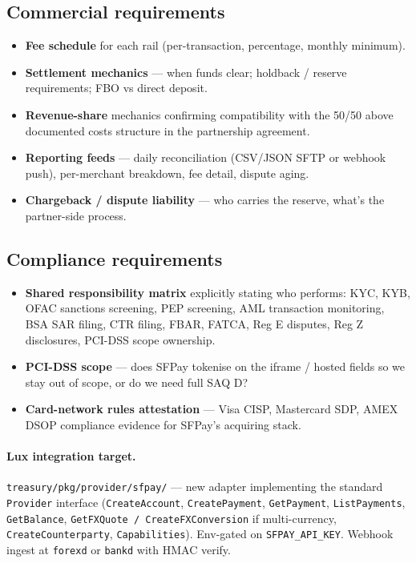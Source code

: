 \documentclass[11pt,letterpaper]{article}
\begin{document}
\subsection{Commercial requirements}
\begin{itemize}[leftmargin=1.6em]
  \item \textbf{Fee schedule} for each rail (per-transaction,
        percentage, monthly minimum).
  \item \textbf{Settlement mechanics} --- when funds clear; holdback /
        reserve requirements; FBO vs direct deposit.
  \item \textbf{Revenue-share} mechanics confirming compatibility with
        the 50/50 above documented costs structure in the partnership
        agreement.
  \item \textbf{Reporting feeds} --- daily reconciliation (CSV/JSON
        SFTP or webhook push), per-merchant breakdown, fee detail,
        dispute aging.
  \item \textbf{Chargeback / dispute liability} --- who carries the
        reserve, what's the partner-side process.
\end{itemize}

\subsection{Compliance requirements}
\begin{itemize}[leftmargin=1.6em]
  \item \textbf{Shared responsibility matrix} explicitly stating who
        performs: KYC, KYB, OFAC sanctions screening, PEP screening,
        AML transaction monitoring, BSA SAR filing, CTR filing, FBAR,
        FATCA, Reg E disputes, Reg Z disclosures, PCI-DSS scope
        ownership.
  \item \textbf{PCI-DSS scope} --- does SFPay tokenise on the iframe /
        hosted fields so we stay out of scope, or do we need full
        SAQ D?
  \item \textbf{Card-network rules attestation} --- Visa CISP,
        Mastercard SDP, AMEX DSOP compliance evidence for SFPay's
        acquiring stack.
\end{itemize}

\paragraph{Lux integration target.}
\texttt{treasury/pkg/provider/sfpay/} --- new adapter implementing the
standard \texttt{Provider} interface (\texttt{CreateAccount},
\texttt{CreatePayment}, \texttt{GetPayment}, \texttt{ListPayments},
\texttt{GetBalance}, \texttt{GetFXQuote / CreateFXConversion} if
multi-currency, \texttt{CreateCounterparty}, \texttt{Capabilities}).
Env-gated on \texttt{SFPAY\_API\_KEY}. Webhook ingest at \texttt{forexd}
or \texttt{bankd} with HMAC verify.
\end{document}
